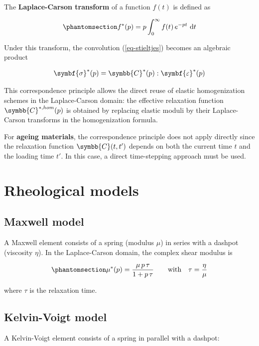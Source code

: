 \documentclass[
  a4paper,
  numbers=noendperiod,
  DIV=12]{scrreprt}
\newcommand{\uu}[1]{{\symbf{{#1}}}}
\newcommand{\uuuu}[1]{{\symbb{{#1}}}}
\newcommand{\eps}{{\uu{{\varepsilon}}}}
\newcommand{\sig}{{\uu{{\sigma}}}}
\newcommand{\ud}{{\,\mathrm{d}}}
\begin{document}
The \textbf{Laplace-Carson transform} of a function \(f(t)\) is defined
as

\begin{equation}\protect\phantomsection\label{eq-laplace-carson}{
f^*(p) = p \int_0^\infty f(t)\, e^{-pt} \, \ud t
}\end{equation}

Under this transform, the convolution (\ref{eq-stieltjes}) becomes an
algebraic product

\[
\sig^*(p) = \uuuu{C}^*(p) : \eps^*(p)
\]

This correspondence principle allows the direct reuse of elastic
homogenization schemes in the Laplace-Carson domain: the effective
relaxation function \(\uuuu{C}^{*,hom}(p)\) is obtained by replacing
elastic moduli by their Laplace-Carson transforms in the homogenization
formula.

For \textbf{ageing materials}, the correspondence principle does not
apply directly since the relaxation function \(\uuuu{C}(t,t')\) depends
on both the current time \(t\) and the loading time \(t'\). In this
case, a direct time-stepping approach must be used.

\section{Rheological models}\label{rheological-models}

\subsection{Maxwell model}\label{maxwell-model}

A Maxwell element consists of a spring (modulus \(\mu\)) in series with
a dashpot (viscosity \(\eta\)). In the Laplace-Carson domain, the
complex shear modulus is

\begin{equation}\protect\phantomsection\label{eq-maxwell}{
\mu^*(p) = \frac{\mu \, p \, \tau}{1 + p \, \tau}
\qquad\text{with}\quad \tau = \frac{\eta}{\mu}
}\end{equation}

where \(\tau\) is the relaxation time.

\subsection{Kelvin-Voigt model}\label{kelvin-voigt-model}

A Kelvin-Voigt element consists of a spring in parallel with a dashpot:
\end{document}
